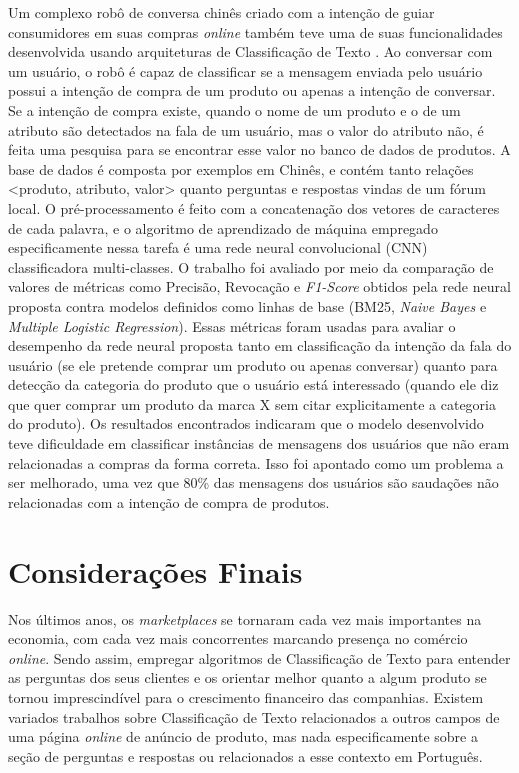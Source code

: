 Um complexo robô de conversa chinês criado com a intenção de guiar consumidores em suas compras \textit{online} também teve uma de suas funcionalidades desenvolvida usando arquiteturas de Classificação de Texto \cite{relacionado_chi}. Ao conversar com um usuário, o robô é capaz de classificar se a mensagem enviada pelo usuário possui a intenção de compra de um produto ou apenas a intenção de conversar. Se a intenção de compra existe, quando o nome de um produto e o de um atributo são detectados na fala de um usuário, mas o valor do atributo não, é feita uma pesquisa para se encontrar esse valor no banco de dados de produtos. A base de dados é composta por exemplos em Chinês, e contém tanto relações <produto, atributo, valor> quanto perguntas e respostas vindas de um fórum local. O pré-processamento é feito com a concatenação dos vetores de caracteres de cada palavra, e o algoritmo de aprendizado de máquina empregado especificamente nessa tarefa é uma rede neural convolucional (CNN) classificadora multi-classes. O trabalho foi avaliado por meio da comparação de valores de métricas como Precisão, Revocação e \textit{F1-Score} obtidos pela rede neural proposta contra modelos definidos como linhas de base (BM25, \textit{Naive Bayes} e \textit{Multiple Logistic Regression}). Essas métricas foram usadas para avaliar o desempenho da rede neural proposta tanto em classificação da intenção da fala do usuário (se ele pretende comprar um produto ou apenas conversar) quanto para detecção da categoria do produto que o usuário está interessado (quando ele diz que quer comprar um produto da marca X sem citar explicitamente a categoria do produto). Os resultados encontrados indicaram que o modelo desenvolvido teve dificuldade em classificar instâncias de mensagens dos usuários que não eram relacionadas a compras da forma correta. Isso foi apontado como um problema a ser melhorado, uma vez que 80\% das mensagens dos usuários são saudações não relacionadas com a intenção de compra de produtos.

\section{Considerações Finais}
Nos últimos anos, os \textit{marketplaces} se tornaram cada vez mais importantes na economia, com cada vez mais concorrentes marcando presença no comércio \textit{online}. Sendo assim, empregar algoritmos de Classificação de Texto para entender as perguntas dos seus clientes e os orientar melhor quanto a algum produto se tornou imprescindível para o crescimento financeiro das companhias. Existem variados trabalhos sobre Classificação de Texto relacionados a outros campos de uma página \textit{online} de anúncio de produto, mas nada especificamente sobre a seção de perguntas e respostas ou relacionados a esse contexto em Português.

